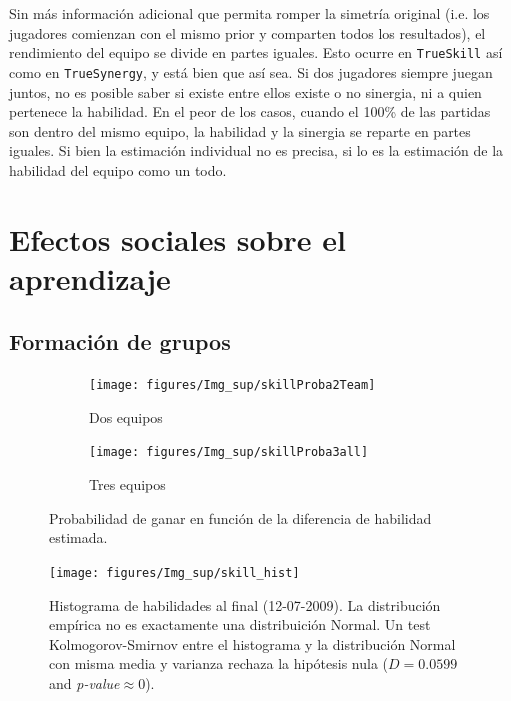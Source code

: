 \documentclass[a4paper,11pt]{book}
\theoremstyle{definition}
\begin{document}
Sin m\'as informaci\'on adicional que permita romper la simetr\'ia original (i.e. los jugadores comienzan con el mismo prior y comparten todos los resultados), el rendimiento del equipo se divide en partes iguales.
Esto ocurre en \texttt{TrueSkill} as\'i como en \texttt{TrueSynergy}, y est\'a bien que as\'i sea.
Si dos jugadores siempre juegan juntos, no es posible saber si existe entre ellos existe o no sinergia, ni a quien pertenece la habilidad.
En el peor de los casos, cuando el 100\% de las partidas son dentro del mismo equipo, la habilidad y la sinergia se reparte en partes iguales.
Si bien la estimaci\'on individual no es precisa, si lo es la estimaci\'on de la habilidad del equipo como un todo.



\section{Efectos sociales sobre el aprendizaje}

\subsection{Formación de grupos}

\begin{figure}[H]
  \centering
  \begin{subfigure}[b]{0.49\textwidth}
    \texttt{[image: figures/Img\_sup/skillProba2Team]}
    \caption{Dos equipos}
    \label{skillProba2_ind_team}
  \end{subfigure}
  \begin{subfigure}[b]{0.49\textwidth}
    \texttt{[image: figures/Img\_sup/skillProba3all]}
    \caption{Tres equipos}
    \label{skillProba3all}
  \end{subfigure}
  \caption{Probabilidad de ganar en función de la diferencia de habilidad estimada.}
  \label{skill_proba}
\end{figure}



\begin{figure}[H]
    \centering
    \texttt{[image: figures/Img\_sup/skill\_hist]}
    \caption{
    Histograma de habilidades al final (12-07-2009).
    La distribución empírica no es exactamente una distribuición Normal. Un test Kolmogorov-Smirnov entre el histograma y la distribución Normal con misma media y varianza rechaza la hipótesis nula ($D = 0.0599$ and \emph{p-value}$\approx 0$).}
    \label{skill_hist}
\end{figure}
\end{document}

